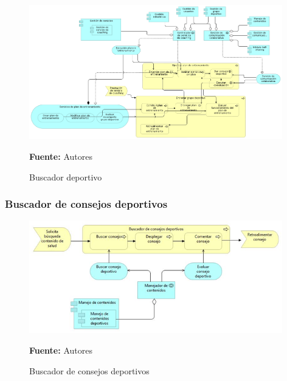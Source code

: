 \begin{figure}[!htb]
  \begin{center}
    \includegraphics[width=11cm]{./imagenes/application_usage/entrenamientodeportivo.png}
    \caption{Buscador deportivo}
    \label{fig:BF_BuscadorDeportivo}
    \textbf{Fuente:}  Autores
  \end{center}
\end{figure}

\subsubsection{Buscador de consejos deportivos}

\begin{figure}[!htb]
  \begin{center}
    \includegraphics[width=11cm]{./imagenes/application_usage/buscadorconsejosdeportivos.png}
    \caption{Buscador de consejos deportivos}
    \label{fig:BP_BuscadorConsejosDeportivos}
    \textbf{Fuente:}  Autores
  \end{center}
\end{figure}

